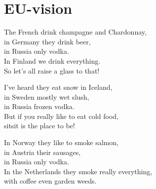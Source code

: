 \section{EU-vision}

The French drink champagne and Chardonnay,\\
in Germany they drink beer,\\
in Russia only vodka.\\
In Finland we drink everything.\\
So let's all raise a glass to that!

I've heard they eat snow in Iceland,\\
in Sweden mostly wet slush,\\
in Russia frozen vodka.\\
But if you really like to eat cold food,\\
sitsit is the place to be!

In Norway they like to smoke salmon,\\
in Austria their sausages,\\
in Russia only vodka.\\
In the Netherlands they smoke really everything,\\
with coffee even garden weeds.